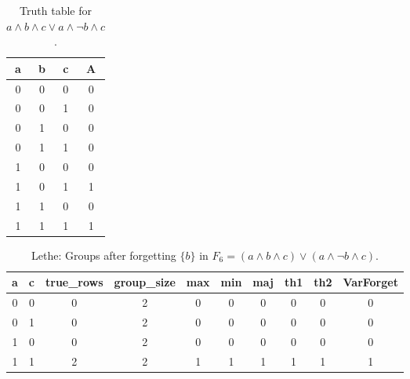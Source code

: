 \begin{table}[!tb]
    \centering
    \begin{tabular}{|c|c|c|c|}
        \hline
        \textbf{a} & \textbf{b} & \textbf{c} & \textbf{A} \\ \hline
        0 & 0 & 0 & 0 \\ \hline
        0 & 0 & 1 & 0 \\ \hline
        0 & 1 & 0 & 0 \\ \hline
        0 & 1 & 1 & 0 \\ \hline
        1 & 0 & 0 & 0 \\ \hline
        1 & 0 & 1 & 1 \\ \hline
        1 & 1 & 0 & 0 \\ \hline
        1 & 1 & 1 & 1 \\ \hline
    \end{tabular}
    \caption{Truth table for $a \land b \land c \lor a \land \lnot b \land c$.}
    \label{tab:truthtab}
\end{table}

\begin{table}[!tb]
    \centering
    \begin{tabular}{|c|c|c|c|c|c|c|c|c|c|}
        \hline
        \textbf{a} & \textbf{c} & \textbf{true\_rows} & \textbf{group\_size} & \textbf{max} & \textbf{min} & \textbf{maj} & \textbf{th1} & \textbf{th2} & \textbf{VarForget} \\ \hline
        \rowcolor{gray!40} 0 & 0 & 0 & 2 & 0 & 0 & 0 & 0 & 0 & 0 \\ \hline
        \rowcolor{blue!40} 0 & 1 & 0 & 2 & 0 & 0 & 0 & 0 & 0 & 0 \\ \hline
        \rowcolor{red!40} 1 & 0 & 0 & 2 & 0 & 0 & 0 & 0 & 0 & 0 \\ \hline
        \rowcolor{green!40} 1 & 1 & 2 & 2 & 1 & 1 & 1 & 1 & 1 & 1 \\ \hline
    \end{tabular}
    \caption{Lethe: Groups after forgetting $\{b\}$ in $F_{6} = (a \land b \land c) \lor (a \land \lnot b \land c)$.}
    \label{tab:lethe-F6-b-groups}
\end{table}
